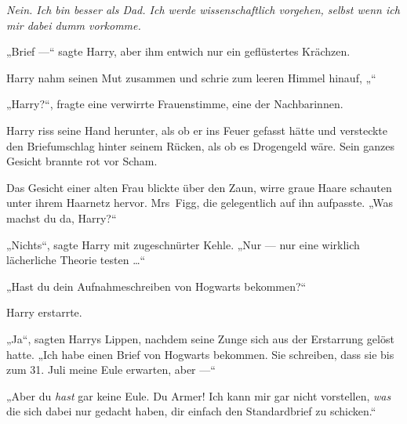 \emph{Nein. Ich bin besser als Dad. Ich werde wissenschaftlich vorgehen, selbst wenn ich mir dabei dumm vorkomme.}

„Brief —“ sagte Harry, aber ihm entwich nur ein geflüstertes Krächzen.

Harry nahm seinen Mut zusammen und schrie zum leeren Himmel hinauf, „“

„Harry?“, fragte eine verwirrte Frauenstimme, eine der Nachbarinnen.

Harry riss seine Hand herunter, als ob er ins Feuer gefasst hätte und versteckte den Briefumschlag hinter seinem Rücken, als ob es Drogengeld wäre. Sein ganzes Gesicht brannte rot vor Scham.

Das Gesicht einer alten Frau blickte über den Zaun, wirre graue Haare schauten unter ihrem Haarnetz hervor. Mrs~Figg, die gelegentlich auf ihn aufpasste.
„Was machst du da, Harry?“

„Nichts“, sagte Harry mit zugeschnürter Kehle.
„Nur — nur eine wirklich lächerliche Theorie testen …“

„Hast du dein Aufnahmeschreiben von Hogwarts bekommen?“

Harry erstarrte.

„Ja“, sagten Harrys Lippen, nachdem seine Zunge sich aus der Erstarrung gelöst hatte.
„Ich habe einen Brief von Hogwarts bekommen. Sie schreiben, dass sie bis zum 31. Juli meine Eule erwarten, aber —“

„Aber du \emph{hast} gar keine Eule. Du Armer! Ich kann mir gar nicht vorstellen, \emph{was} die sich dabei nur gedacht haben, dir einfach den Standardbrief zu schicken.“

